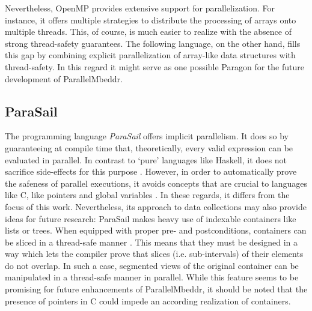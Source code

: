 Nevertheless, OpenMP provides extensive support for parallelization. For instance, it offers multiple strategies to distribute the processing of arrays onto multiple threads. This, of course, is much easier to realize with the absence of strong thread-safety guarantees. The following language, on the other hand, fills this gap by combining explicit parallelization of array-like data structures with thread-safety. In this regard it might serve as one possible Paragon for the future development of ParallelMbeddr.

\subsection{ParaSail}
The programming language \textit{ParaSail} offers implicit parallelism. It does so by guaranteeing at compile time that, theoretically, every valid expression can be evaluated in parallel. In contrast to `pure' languages like Haskell, it does not sacrifice side-effects for this purpose \cite{APointerFreePath}. However, in order to automatically prove the safeness of parallel executions, it avoids concepts that are crucial to languages like C, like pointers and global variables \cite{ParaSailLessIsMore}. In these regards, it differs from the focus of this work. Nevertheless, its approach to data collections may also provide ideas for future research: ParaSail makes heavy use of indexable containers like lists or trees. When equipped with proper pre- and postconditions, containers can be sliced in a thread-safe manner \cite{ParaSailReferenceManual}. This means that they must be designed in a way which lets the compiler prove that slices (i.e. sub-intervals) of their elements do not overlap. In such a case, segmented views of the original container can be manipulated in a thread-safe manner in parallel. While this feature seems to be promising for future enhancements of ParallelMbeddr, it should be noted that the presence of pointers in C could impede an according realization of containers.

